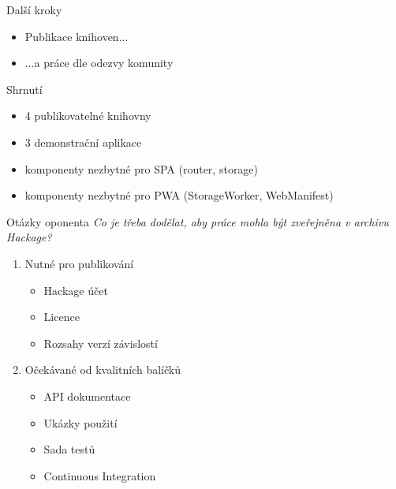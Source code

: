 \documentclass[presentation]{beamer}
\begin{document}
\begin{frame}{Další kroky}
  \begin{itemize}
    \item Publikace knihoven...
    \item ...a práce dle odezvy komunity
  \end{itemize}
\end{frame}

\begin{frame}{Shrnutí}
  \begin{itemize}
    \item 4 publikovatelné knihovny
    \item 3 demonstrační aplikace
    \medskip
    \item komponenty nezbytné pro SPA (router, storage)
    \item komponenty nezbytné pro PWA (StorageWorker, WebManifest)
  \end{itemize}
\end{frame}


\appendix
\begin{frame}{Otázky oponenta}
  \emph{Co je třeba dodělat, aby práce mohla být zveřejněna v archivu Hackage?}
  \medskip
  \begin{enumerate}
    \item Nutné pro publikování
      \begin{itemize}
        \item Hackage účet
        \item Licence
        \item Rozsahy verzí závislostí
      \end{itemize}
    \item Očekávané od kvalitních balíčků
      \begin{itemize}
        \item API dokumentace
        \item Ukázky použití
        \item Sada testů
        \item Continuous Integration
      \end{itemize}
  \end{enumerate}
\end{frame}
\end{document}
